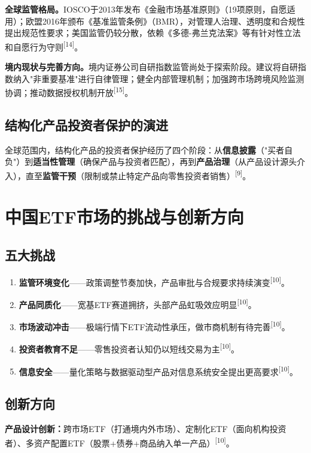 \documentclass[10pt,a4paper,twocolumn]{ctexart}
\begin{document}
\textbf{全球监管格局。}IOSCO于2013年发布《金融市场基准原则》（19项原则，自愿适用）；欧盟2016年颁布《基准监管条例》（BMR），对管理人治理、透明度和合规性提出规范性要求；美国监管仍较分散，依赖《多德-弗兰克法案》等有针对性立法和自愿行为守则\textsuperscript{[14]}。

\textbf{境内现状与完善方向。}境内证券公司自研指数监管尚处于探索阶段。建议将自研指数纳入"非重要基准"进行自律管理；健全内部管理机制；加强跨市场跨境风险监测协调；推动数据授权机制开放\textsuperscript{[15]}。

\subsection{结构化产品投资者保护的演进}

全球范围内，结构化产品的投资者保护经历了四个阶段：从\textbf{信息披露}（"买者自负"）到\textbf{适当性管理}（确保产品与投资者匹配），再到\textbf{产品治理}（从产品设计源头介入），直至\textbf{监管干预}（限制或禁止特定产品向零售投资者销售）\textsuperscript{[9]}。

\section{中国ETF市场的挑战与创新方向}

\subsection{五大挑战}
\begin{enumerate}[label=\textcolor{themeblue}{\arabic*.}]
\item \textbf{监管环境变化}——政策调整节奏加快，产品审批与合规要求持续演变\textsuperscript{[10]}。
\item \textbf{产品同质化}——宽基ETF赛道拥挤，头部产品虹吸效应明显\textsuperscript{[10]}。
\item \textbf{市场波动冲击}——极端行情下ETF流动性承压，做市商机制有待完善\textsuperscript{[10]}。
\item \textbf{投资者教育不足}——零售投资者认知仍以短线交易为主\textsuperscript{[10]}。
\item \textbf{信息安全}——量化策略与数据驱动型产品对信息系统安全提出更高要求\textsuperscript{[10]}。
\end{enumerate}

\subsection{创新方向}

\textbf{产品设计创新：}跨市场ETF（打通境内外市场）、定制化ETF（面向机构投资者）、多资产配置ETF（股票+债券+商品纳入单一产品）\textsuperscript{[10]}。
\end{document}

